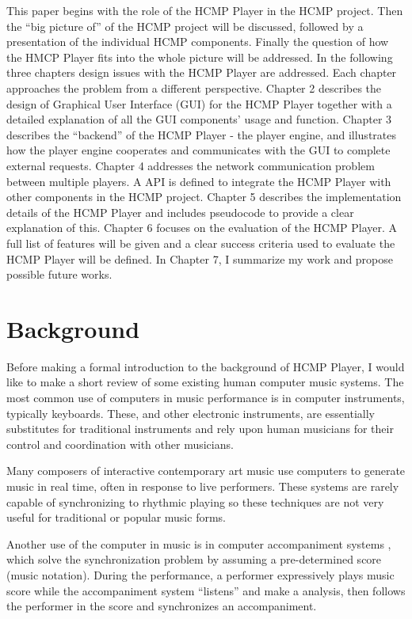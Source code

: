 This paper begins with the role of the HCMP Player in the HCMP project. Then
the ``big picture of'' of the HCMP project will be discussed, followed by a
presentation of the individual HCMP components. Finally the question of how
the HMCP Player fits into the whole picture will be addressed. In the
following three chapters design issues with the HCMP Player are addressed.
Each chapter approaches the problem from a different perspective. Chapter 2
describes the design of Graphical User Interface (GUI) for the HCMP Player together
with a detailed explanation of all the GUI components' usage and function.
Chapter 3 describes the ``backend'' of the HCMP Player - the player engine,
and illustrates how the player engine cooperates and communicates with the
GUI to complete external requests. Chapter 4 addresses the network
communication problem between multiple players. A API is
defined to integrate the HCMP Player with other components in the HCMP
project.  Chapter 5 describes the implementation details of the HCMP Player
and includes pseudocode to provide a clear explanation of this. Chapter 6
focuses on the evaluation of the HCMP Player. A full list of features
will be given and a clear success criteria used to evaluate the HCMP Player
will be defined. In Chapter 7, I summarize my work and propose possible
future works.

\section{Background}

Before making a formal introduction to the background of HCMP Player, 
I would like to make a short review of  
some existing human computer music systems. The most common use of 
computers in
music performance is in computer instruments, typically keyboards.
These, and other electronic instruments, are essentially substitutes 
for traditional
instruments and rely upon human musicians for their control and 
coordination with other musicians. 

Many composers of interactive contemporary art music use computers
to generate music in real time, often in response to live performers.
These systems are rarely capable of synchronizing to rhythmic playing
so these techniques are not very useful for traditional or popular music 
forms.

Another use of the computer in music is in computer accompaniment systems 
\cite{Roger:89}, 
which solve the synchronization problem by assuming a pre-determined 
score (music notation). During the performance, a performer expressively 
plays music score while the accompaniment system ``listens'' and make a analysis, 
then follows the performer 
in the score and synchronizes an accompaniment.

